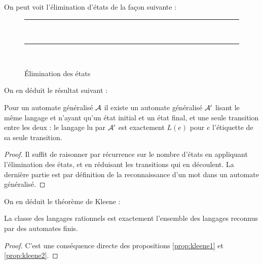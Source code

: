 On peut voit l'élimination d'états de la façon suivante :

\begin{figure}[htb]
    \centering
    \rule{17cm}{0.5pt}\\
    \vspace{0.5cm}
    \rule{17cm}{0.5pt}\\
    \vspace{0.5cm}
    \caption{\'Elimination des états}
\end{figure}

On en déduit le résultat suivant :

\begin{prop}\label{prop:kleene2}
    Pour un automate généralisé $\mathcal A$ il existe un automate généralisé $\mathcal A'$ lisant le même langage et n'ayant qu'un état initial et un état final, et une seule transition entre les deux : le langage lu par $\mathcal A'$ est exactement $L(e)$ pour $e$ l'étiquette de sa seule transition.
\end{prop}

\begin{proof}
    Il suffit de raisonner par récurrence sur le nombre d'états en appliquant l'élimination des états, et en réduisant les transitions qui en découlent. La dernière partie est par définition de la reconnaissance d'un mot dans un automate généralisé.
\end{proof}

On en déduit le théorème de Kleene :

\begin{them}[Kleene]
    La classe des langages rationnels est exactement l'ensemble des langages reconnus par des automates finis.
\end{them}

\begin{proof}
    C'est une conséquence directe des propositions \ref{prop:kleene1} et \ref{prop:kleene2}.
\end{proof}

